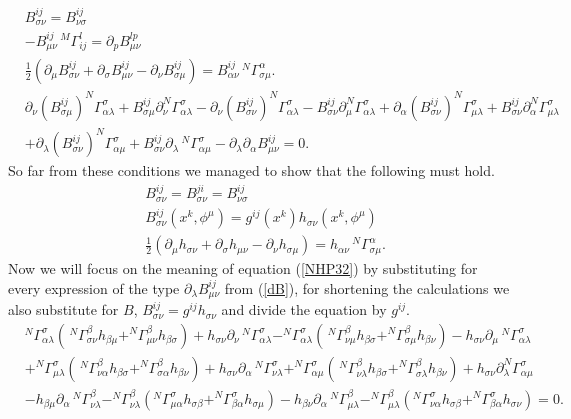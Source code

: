 \documentclass[english]{article}
\begin{document}
\begin{align}
\label{NHP11}
&B^{ij}_{\sigma\nu}=B^{ij}_{\nu\sigma}\\
\label{NHP21}
&-B^{ij}_{\mu\nu}\,^M\Gamma^l_{ij}=\partial_p B^{lp}_{\mu\nu}\\
\label{NHP31}
&\frac{1}{2}\left(\partial_\mu B^{ij}_{\sigma\nu}+\partial_\sigma B^{ij}_{\mu\nu}-\partial_\nu B^{ij}_{\sigma\mu}\right)=B^{ij}_{\alpha\nu}\,^N\Gamma^\alpha_{\sigma\mu}.\\
\nonumber
&\partial_\nu (B^{ij}_{\sigma\mu})^N\Gamma^\sigma_{\alpha\lambda}+B^{ij}_{\sigma\mu}\partial_\nu^N\Gamma^\sigma_{\alpha\lambda}-\partial_\nu(B^{ij}_{\sigma\nu})^N\Gamma^\sigma_{\alpha\lambda}-B^{ij}_{\sigma\nu}\partial_\mu^N\Gamma^\sigma_{\alpha\lambda}+\partial_\alpha(B^{ij}_{\sigma\nu})^N\Gamma^\sigma_{\mu\lambda}+B^{ij}_{\sigma\nu}\partial_\alpha^N\Gamma^\sigma_{\mu\lambda}\\
\label{NHP32}
&+\partial_\lambda(B^{ij}_{\sigma\nu})^N\Gamma^\sigma_{\alpha\mu}+B^{ij}_{\sigma\nu}\partial_\lambda\,^N\Gamma^\sigma_{\alpha\mu}-\partial_\lambda\partial_\alpha B^{ij}_{\mu\nu}=0.
\end{align}
So far from these conditions we managed to show that the following must hold.
\begin{align*}
&B^{ij}_{\sigma\nu}=B^{ji}_{\sigma\nu}=B^{ij}_{\nu\sigma}\\
&B^{ij}_{\sigma\nu}(x^k,\phi^\mu)=g^{ij}(x^k)h_{\sigma\nu}(x^k,\phi^\mu)\\
&\frac{1}{2}\left(\partial_\mu h_{\sigma\nu}+\partial_\sigma h_{\mu\nu}-\partial_\nu h_{\sigma\mu}\right)=h_{\alpha\nu}\,^N\Gamma^\alpha_{\sigma\mu}.
\end{align*}
Now we will focus on the meaning of equation (\ref{NHP32}) by substituting for every expression of the type $\partial_\lambda B^{ij}_{\mu\nu}$ from (\ref{dB}), for shortening the calculations we also substitute for $B$, $B^{ij}_{\sigma\nu}=g^{ij}h_{\sigma\nu}$ and divide the equation by $g^{ij}$.
\begin{align*}
&^N\Gamma^\sigma_{\alpha\lambda}\left(\,^N\Gamma^\beta_{\sigma\nu}h_{\beta\mu}+^N\Gamma^\beta_{\mu\nu}h_{\beta\sigma}\right)
+h_{\sigma\nu}\partial_\nu\,^N\Gamma^\sigma_{\alpha\lambda}-^N\Gamma_{\alpha\lambda}^\sigma\left(\,^N\Gamma^\beta_{\nu\mu}h_{\beta\sigma}+^N\Gamma_{\sigma\mu}^\beta h_{\beta\nu}\right)-h_{\sigma\nu}\partial_\mu\,^N\Gamma^\sigma_{\alpha\lambda}\\
&+^N\Gamma^\sigma_{\mu\lambda}\left(\,^N\Gamma^\beta_{\nu\alpha}h_{\beta\sigma}+^N\Gamma^\beta_{\sigma\alpha}h_{\beta\nu}\right)
+h_{\sigma\nu}\partial_\alpha\,^N\Gamma^\sigma_{\nu\lambda}+^N\Gamma^\sigma_{\alpha\mu}\left(\,^N\Gamma^\beta_{\nu\lambda}h_{\beta\sigma}+^N\Gamma^\beta_{\sigma\lambda}h_{\beta\nu}\right)+h_{\sigma\nu}\partial_\lambda^N\Gamma^\sigma_{\alpha\mu}\\
&-h_{\beta\mu}\partial_\alpha\,^N\Gamma^\beta_{\nu\lambda}-^N\Gamma^\beta_{\nu\lambda}\left(^N\Gamma^\sigma_{\mu\alpha}h_{\sigma\beta}+^N\Gamma^\sigma_{\beta\alpha}h_{\sigma\mu}\right)-h_{\beta\nu}\partial_\alpha\,^N\Gamma^\beta_{\mu\lambda}-^N\Gamma^\beta_{\mu\lambda}\left(^N\Gamma^\sigma_{\nu\alpha}h_{\sigma\beta}+^N\Gamma^\sigma_{\beta\alpha}h_{\sigma\nu}\right)=0.\\
\end{align*}
\end{document}
